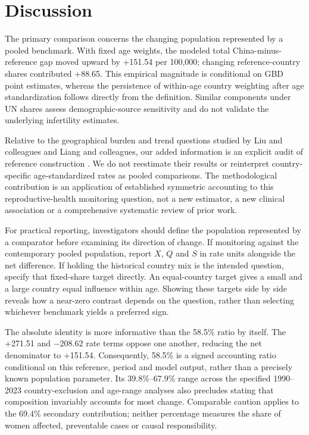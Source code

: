 \documentclass[11pt,a4paper]{article}
\begin{document}
\section{Discussion}
The primary comparison concerns the changing population represented by a pooled benchmark. With fixed age weights, the modeled total China-minus-reference gap moved upward by +151.54 per 100,000; changing reference-country shares contributed +88.65. This empirical magnitude is conditional on GBD point estimates, whereas the persistence of within-age country weighting after age standardization follows directly from the definition. Similar components under UN shares assess demographic-source sensitivity and do not validate the underlying infertility estimates.

Relative to the geographical burden and trend questions studied by Liu and colleagues and Liang and colleagues, our added information is an explicit audit of reference construction \citep{liu_pcos2024,liang_burden2025,liang_trend2026}. We do not reestimate their results or reinterpret country-specific age-standardized rates as pooled comparisons. The methodological contribution is an application of established symmetric accounting to this reproductive-health monitoring question, not a new estimator, a new clinical association or a comprehensive systematic review of prior work.

For practical reporting, investigators should define the population represented by a comparator before examining its direction of change. If monitoring against the contemporary pooled population, report $X$, $Q$ and $S$ in rate units alongside the net difference. If holding the historical country mix is the intended question, specify that fixed-share target directly. An equal-country target gives a small and a large country equal influence within age. Showing these targets side by side reveals how a near-zero contrast depends on the question, rather than selecting whichever benchmark yields a preferred sign.

The absolute identity is more informative than the 58.5\% ratio by itself. The +271.51 and $-208.62$ rate terms oppose one another, reducing the net denominator to +151.54. Consequently, 58.5\% is a signed accounting ratio conditional on this reference, period and model output, rather than a precisely known population parameter. Its 39.8\%--67.9\% range across the specified 1990--2023 country-exclusion and age-range analyses also precludes stating that composition invariably accounts for most change. Comparable caution applies to the 69.4\% secondary contribution; neither percentage measures the share of women affected, preventable cases or causal responsibility.
\end{document}
